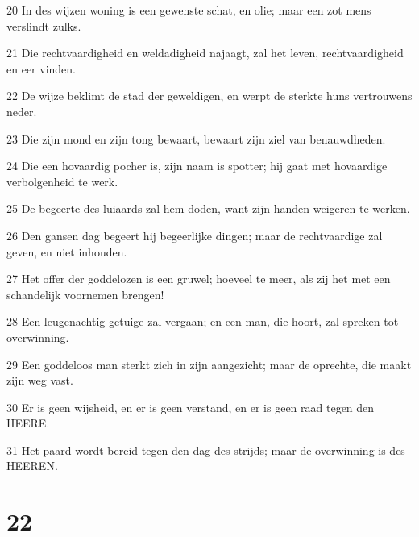 \par 20 In des wijzen woning is een gewenste schat, en olie; maar een zot mens verslindt zulks.
\par 21 Die rechtvaardigheid en weldadigheid najaagt, zal het leven, rechtvaardigheid en eer vinden.
\par 22 De wijze beklimt de stad der geweldigen, en werpt de sterkte huns vertrouwens neder.
\par 23 Die zijn mond en zijn tong bewaart, bewaart zijn ziel van benauwdheden.
\par 24 Die een hovaardig pocher is, zijn naam is spotter; hij gaat met hovaardige verbolgenheid te werk.
\par 25 De begeerte des luiaards zal hem doden, want zijn handen weigeren te werken.
\par 26 Den gansen dag begeert hij begeerlijke dingen; maar de rechtvaardige zal geven, en niet inhouden.
\par 27 Het offer der goddelozen is een gruwel; hoeveel te meer, als zij het met een schandelijk voornemen brengen!
\par 28 Een leugenachtig getuige zal vergaan; en een man, die hoort, zal spreken tot overwinning.
\par 29 Een goddeloos man sterkt zich in zijn aangezicht; maar de oprechte, die maakt zijn weg vast.
\par 30 Er is geen wijsheid, en er is geen verstand, en er is geen raad tegen den HEERE.
\par 31 Het paard wordt bereid tegen den dag des strijds; maar de overwinning is des HEEREN.

\chapter{22}

